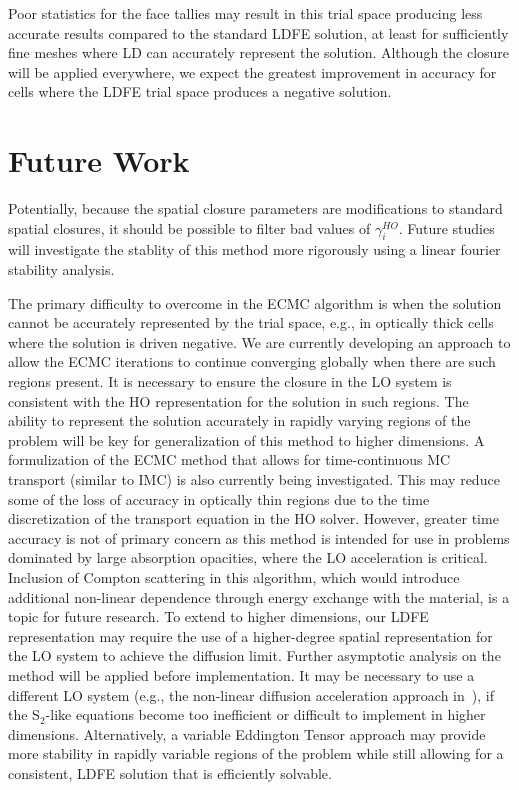 Poor statistics for the face tallies may result in this trial space producing less
accurate results compared to the standard LDFE solution, at least for sufficiently fine meshes where LD
can accurately represent the solution.  Although the closure will be applied everywhere,
we expect the greatest improvement in accuracy for cells where the LDFE trial space
produces a negative solution.



\section{Future Work} 

Potentially, because the spatial closure parameters are modifications to standard spatial closures, it should be possible to filter bad
values of $\gamma^{HO}_i$.  Future studies will investigate the stablity of
this method more rigorously using a linear fourier stability analysis.

The primary difficulty to overcome in the ECMC algorithm is when the solution cannot
be accurately represented by the trial space, e.g., in optically thick cells where
the solution is driven negative.   We are currently developing an approach to allow
the ECMC iterations to continue converging globally when there are such regions
present.  It is necessary to ensure the
 closure in the LO system is consistent with the HO
representation for the solution in such regions.  The ability to represent the solution accurately in
rapidly varying regions of the problem will be key for generalization of this method
to higher dimensions.  A formulization of the ECMC method
that allows for time-continuous MC transport (similar to IMC) is also currently being
investigated.  This may reduce some of the loss of accuracy in optically thin regions
due to the time discretization of the transport equation in the HO solver.
However, greater time accuracy is not of primary concern as this method is intended
for use in problems dominated by large absorption opacities, where the LO
acceleration is critical. Inclusion of Compton scattering in this algorithm, which would introduce
additional non-linear dependence through energy exchange with the
material, is a topic for future research.
  To extend
to higher dimensions, our LDFE representation may require the use of a higher-degree
spatial representation for the LO system to achieve the diffusion
limit. Further asymptotic
analysis on the method will be applied before implementation. It may be necessary to use a different LO system (e.g., the non-linear diffusion
acceleration approach in~\cite{rmc}), if the S$_2$-like equations become too
inefficient or difficult to implement in higher dimensions.  Alternatively, a
variable Eddington Tensor approach may provide more stability in rapidly variable
regions of the problem while still allowing for a consistent, LDFE solution that is efficiently solvable.

